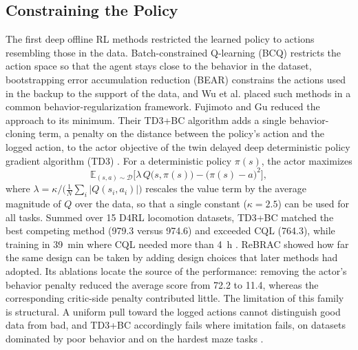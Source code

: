 \documentclass[journal]{IEEEtran}
\begin{document}
\subsection{Constraining the Policy}
The first deep offline RL methods restricted the learned policy to actions resembling those in the data. Batch-constrained Q-learning (BCQ) \cite{fujimoto2019bcq} restricts the action space so that the agent stays close to the behavior in the dataset, bootstrapping error accumulation reduction (BEAR) \cite{kumar2019bear} constrains the actions used in the backup to the support of the data, and Wu et al. \cite{wu2019brac} placed such methods in a common behavior-regularization framework. Fujimoto and Gu \cite{fujimoto2021td3bc} reduced the approach to its minimum. Their TD3+BC algorithm adds a single behavior-cloning term, a penalty on the distance between the policy's action and the logged action, to the actor objective of the twin delayed deep deterministic policy gradient algorithm (TD3) \cite{fujimoto2018td3}. For a deterministic policy $\pi(s)$, the actor maximizes
\begin{equation}
\mathbb{E}_{(s,a) \sim \mathcal{D}}\Big[\lambda\, Q\big(s,\pi(s)\big) - \big(\pi(s) - a\big)^{2}\Big],
\label{eq:td3bc}
\end{equation}
where $\lambda = \kappa \big/ \big(\tfrac{1}{N}\sum_{i} |Q(s_i,a_i)|\big)$ rescales the value term by the average magnitude of $Q$ over the data, so that a single constant ($\kappa = 2.5$) can be used for all tasks. Summed over 15 D4RL locomotion datasets, TD3+BC matched the best competing method (979.3 versus 974.6) and exceeded CQL (764.3), while training in 39~min where CQL needed more than 4~h \cite{fujimoto2021td3bc}. ReBRAC \cite{tarasov2023rebrac} showed how far the same design can be taken by adding design choices that later methods had adopted. Its ablations locate the source of the performance: removing the actor's behavior penalty reduced the average score from 72.2 to 11.4, whereas the corresponding critic-side penalty contributed little. The limitation of this family is structural. A uniform pull toward the logged actions cannot distinguish good data from bad, and TD3+BC accordingly fails where imitation fails, on datasets dominated by poor behavior and on the hardest maze tasks \cite{fujimoto2021td3bc}.
\end{document}
